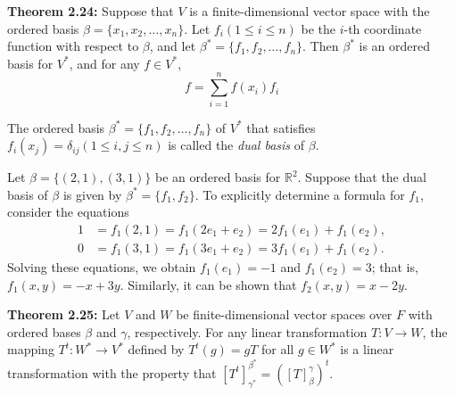 \documentclass{report}
\begin{document}
        \begin{thBox}
        \textbf{Theorem 2.24:} Suppose that \( V \) is a finite-dimensional vector space with the ordered basis \( \beta = \{x_1, x_2, \ldots, x_n\} \). Let \( f_i (1 \leq i \leq n) \) be the \( i \)-th coordinate function with respect to \( \beta \), and let \( \beta^* = \{f_1, f_2, \ldots, f_n\} \). Then \( \beta^* \) is an ordered basis for \( V^* \), and for any \( f \in V^* \),
        $$
        f = \sum_{i=1}^n f(x_i) f_i
        $$
        \end{thBox}
        
        \begin{defBox}
        The ordered basis \( \beta^* = \{f_1, f_2, \ldots, f_n\} \) of \( V^* \) that satisfies \( f_i(x_j) = \delta_{ij} (1 \leq i, j \leq n) \) is called the \emph{dual basis} of \( \beta \).
        \end{defBox}
        
        \begin{Example}
        Let \( \beta = \{(2, 1), (3, 1)\} \) be an ordered basis for \( \mathbb{R}^2 \). Suppose that the dual basis of \( \beta \) is given by \( \beta^* = \{f_1, f_2\} \). To explicitly determine a formula for \( f_1 \), consider the equations
        $$
        \begin{aligned}
        1 &= f_1(2, 1) = f_1(2e_1 + e_2) = 2f_1(e_1) + f_1(e_2), \\
        0 &= f_1(3, 1) = f_1(3e_1 + e_2) = 3f_1(e_1) + f_1(e_2).
        \end{aligned}
        $$
        Solving these equations, we obtain \( f_1(e_1) = -1 \) and \( f_1(e_2) = 3 \); that is, \( f_1(x, y) = -x + 3y \). Similarly, it can be shown that \( f_2(x, y) = x - 2y \).
        \end{Example}
        
        \begin{thBox}
        \textbf{Theorem 2.25:} Let \( V \) and \( W \) be finite-dimensional vector spaces over \( F \) with ordered bases \( \beta \) and \( \gamma \), respectively. For any linear transformation \( T: V \rightarrow W \), the mapping \( T^t: W^* \rightarrow V^* \) defined by \( T^t(g) = gT \) for all \( g \in W^* \) is a linear transformation with the property that \(\left[ T^t \right]_{\gamma^*}^{\beta^*} = \left( [T]_{\beta}^{\gamma} \right)^t\).
        \end{thBox}
        
\end{document}

